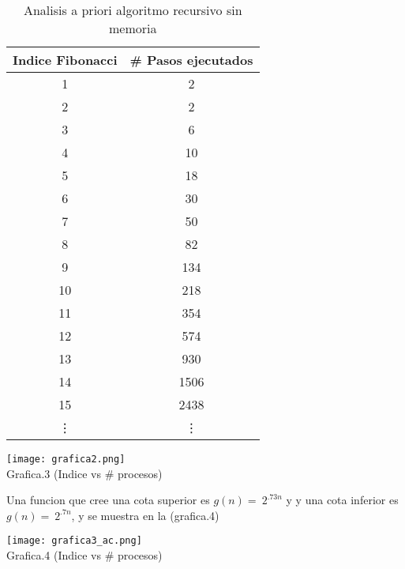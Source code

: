 \documentclass[12pt,twoside]{article}
\begin{document}
\begin{table}[h]
    \centering
    \begin{minipage}{.45\linewidth}
      \centering
      \begin{tabular}{|c|c|}
        \hline
        \textbf{Indice Fibonacci} & \textbf{\# Pasos ejecutados} \\
        \hline

    1 & 2 \\
    2 & 2 \\
    3 & 6 \\
    4 & 10 \\
    5 & 18 \\
    6 & 30 \\
    7 & 50 \\
    8 & 82 \\
    9 & 134 \\
    10 & 218 \\
    11 & 354 \\
    12 & 574 \\
    13 & 930 \\
    14 & 1506 \\
    15 & 2438 \\

    \vdots & \vdots\\

       
        \hline
      \end{tabular}
      \caption{Analisis a priori algoritmo recursivo sin memoria}
      \label{tab:nombre_etiqueta}
    \end{minipage}
\end{table}



\begin{center}
  \begin{minipage}{\linewidth}
    \centering
    \texttt{[image: grafica2.png]}
    \\
    Grafica.3 (Indice vs \# procesos)
\end{minipage}
\end{center}
\medskip

Una funcion que cree una cota superior es $g(n) = \ 2^{.73n}$ y y una cota inferior es $g(n) = \ 2^{.7n}$, y se muestra en la (grafica.4)

\begin{center}
  \begin{minipage}{\linewidth}
    \centering
    \texttt{[image: grafica3\_ac.png]}
    \\
    Grafica.4 (Indice vs \# procesos)
\end{minipage}
\end{center}
\medskip
\end{document}

